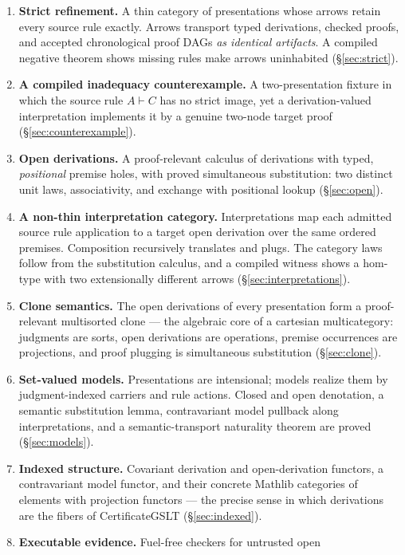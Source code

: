 \documentclass[]{article}
\theoremstyle{remark}
\newcommand{\CertificateGSLT}{\textup{CertificateGSLT}}
\begin{document}
\begin{enumerate}
\item \textbf{Strict refinement.}  A thin category of presentations whose
  arrows retain every source rule exactly.  Arrows transport typed
  derivations, checked proofs, and accepted chronological proof DAGs
  \emph{as identical artifacts}.  A compiled negative theorem shows missing
  rules make arrows uninhabited (\S\ref{sec:strict}).
\item \textbf{A compiled inadequacy counterexample.}  A two-presentation
  fixture in which the source rule $A \vdash C$ has no strict image, yet a
  derivation-valued interpretation implements it by a genuine two-node
  target proof (\S\ref{sec:counterexample}).
\item \textbf{Open derivations.}  A proof-relevant calculus of derivations
  with typed, \emph{positional} premise holes, with proved simultaneous
  substitution: two distinct unit laws, associativity, and exchange with
  positional lookup (\S\ref{sec:open}).
\item \textbf{A non-thin interpretation category.}  Interpretations map each
  admitted source rule application to a target open derivation over the same
  ordered premises.  Composition recursively translates and plugs.  The
  category laws follow from the substitution calculus, and a compiled
  witness shows a hom-type with two extensionally different arrows
  (\S\ref{sec:interpretations}).
\item \textbf{Clone semantics.}  The open derivations of every presentation
  form a proof-relevant multisorted clone --- the algebraic core of a
  cartesian multicategory: judgments are sorts, open derivations are
  operations, premise occurrences are projections, and proof plugging is
  simultaneous substitution (\S\ref{sec:clone}).
\item \textbf{Set-valued models.}  Presentations are intensional; models
  realize them by judgment-indexed carriers and rule actions.  Closed and
  open denotation, a semantic substitution lemma, contravariant model
  pullback along interpretations, and a semantic-transport naturality
  theorem are proved (\S\ref{sec:models}).
\item \textbf{Indexed structure.}  Covariant derivation and open-derivation
  functors, a contravariant model functor, and their concrete Mathlib
  categories of elements with projection functors --- the precise sense in
  which derivations are the fibers of \CertificateGSLT{}
  (\S\ref{sec:indexed}).
\item \textbf{Executable evidence.}  Fuel-free checkers for untrusted open

\end{enumerate}
\end{document}
